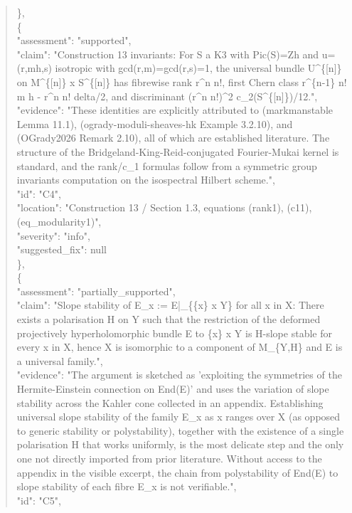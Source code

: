\documentclass[11pt]{article}
\begin{document}
\begin{quote}
    \},\\
    \{\\
      "assessment": "supported",\\
      "claim": "Construction 13 invariants: For S a K3 with Pic(S)=Zh and u=(r,mh,s) isotropic with gcd(r,m)=gcd(r,s)=1, the universal bundle U\^{}\{[n]\} on M\^{}\{[n]\} x S\^{}\{[n]\} has fibrewise rank r\^{}n n!, first Chern class r\^{}\{n-1\} n! m h - r\^{}n n! delta/2, and discriminant (r\^{}n n!)\^{}2 c\_2(S\^{}\{[n]\})/12.",\\
      "evidence": "These identities are explicitly attributed to (markmanstable Lemma 11.1), (ogrady-moduli-sheaves-hk Example 3.2.10), and (OGrady2026 Remark 2.10), all of which are established literature. The structure of the Bridgeland-King-Reid-conjugated Fourier-Mukai kernel is standard, and the rank/c\_1 formulas follow from a symmetric group invariants computation on the isospectral Hilbert scheme.",\\
      "id": "C4",\\
      "location": "Construction 13 / Section 1.3, equations (rank1), (c11), (eq\_modularity1)",\\
      "severity": "info",\\
      "suggested\_fix": null\\
    \},\\
    \{\\
      "assessment": "partially\_supported",\\
      "claim": "Slope stability of E\_x := E|\_\{\{x\} x Y\} for all x in X: There exists a polarisation H on Y such that the restriction of the deformed projectively hyperholomorphic bundle E to \{x\} x Y is H-slope stable for every x in X, hence X is isomorphic to a component of M\_\{Y,H\} and E is a universal family.",\\
      "evidence": "The argument is sketched as 'exploiting the symmetries of the Hermite-Einstein connection on End(E)' and uses the variation of slope stability across the Kahler cone collected in an appendix. Establishing universal slope stability of the family E\_x as x ranges over X (as opposed to generic stability or polystability), together with the existence of a single polarisation H that works uniformly, is the most delicate step and the only one not directly imported from prior literature. Without access to the appendix in the visible excerpt, the chain from polystability of End(E) to slope stability of each fibre E\_x is not verifiable.",\\
      "id": "C5",\\

\end{quote}
\end{document}
